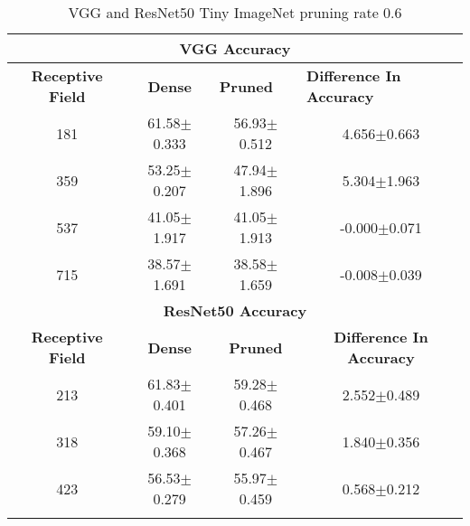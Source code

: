 \begin{table}[H]
  \centering
\begin{tabular}{@{}cccc@{}}
\toprule
\multicolumn{4}{c}{\textbf{VGG  Accuracy}}                                                                                                                                  \\ \midrule
\textbf{Receptive Field} & \textbf{Dense} & \multicolumn{1}{l}{\textbf{Pruned}} & \multicolumn{1}{l}{\textbf{Difference In Accuracy}} \\ \midrule
181                      & 61.58$\pm$0.333              & 56.93$\pm$0.512                                   & 4.656$\pm$0.663                                     \\
359                      & 53.25$\pm$0.207              & 47.94$\pm$1.896                                   & 5.304$\pm$1.963                                     \\
537                      & 41.05$\pm$1.917              & 41.05$\pm$1.913                                   & -0.000$\pm$0.071                                    \\
715                      & 38.57$\pm$1.691              & 38.58$\pm$1.659                                   & -0.008$\pm$0.039                                    \\ \midrule
\multicolumn{4}{c}{\textbf{ResNet50 Accuracy}}                                                                                                                             \\ \midrule
\textbf{Receptive Field} & \textbf{Dense} & \textbf{Pruned}                     & \textbf{Difference In Accuracy}                     \\
213                      & 61.83$\pm$0.401              & 59.28$\pm$0.468                                   & 2.552$\pm$0.489                                     \\
318                      & 59.10$\pm$0.368              & 57.26$\pm$0.467                                   & 1.840$\pm$0.356                                     \\
423                      & 56.53$\pm$0.279              & 55.97$\pm$0.459                                   &
0.568$\pm$0.212                                     \\ \bottomrule \\
\end{tabular}
\caption{VGG and ResNet50 Tiny ImageNet pruning rate 0.6}
\label{tab:tiny imagenet pruning rate06}
\end{table}





